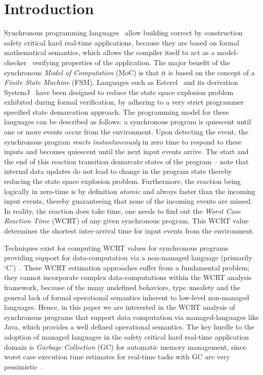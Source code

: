 \section{Introduction}
\label{sec:introduction}

Synchronous programming languages~\cite{berry92} allow building correct
by construction safety critical hard real-time applications, because
they are based on formal mathematical semantics, which allows the
compiler itself to act as a model-checker~\cite{jagadeesan1995safety}
verifying properties of the application. The major benefit of the
synchronous \textit{Model of Computation} (MoC) is that it is based on
the concept of a \textit{Finite State Machine} (FSM). Languages such as
Esterel~\cite{berry92} and its derivation SystemJ~\cite{amal10} have
been designed to reduce the state space explosion problem exhibited
during formal verification, by adhering to a very strict programmer
specified state demarcation approach. The programming model for these
languages can be described as follows: a synchronous program is
quiescent until one or more events occur from the environment. Upon
detecting the event, the synchronous program \textit{reacts}
\textit{instantaneously} in zero time to respond to these inputs and
becomes quiescent until the next input events arrive. The start and the
end of this reaction transition demarcate states of the program -- note
that internal data updates do not lead to change in the program state
thereby reducing the state space explosion problem. Furthermore, the
reaction being logically in zero-time is by definition \textit{atomic}
and always faster than the incoming input events, thereby guaranteeing
that none of the incoming events are missed. In reality, the reaction
does take time, one needs to find out the \textit{Worst Case Reaction
  Time} (WCRT) of any given synchronous program. This WCRT value
determines the shortest inter-arrival time for input events from the
environment.

Techniques exist for computing WCRT values for synchronous programs
providing support for data-computation via a non-managed language
(primarily `C')~\cite{boldt07,proop10}. These WCRT estimation approaches
suffer from a fundamental problem; they cannot incorporate complex
data-computations within the WCRT analysis framework, because of the
many undefined behaviors, type unsafety and the general lack of formal
operational semantics inherent to low-level non-managed
languages. Hence, in this paper we are interested in the WCRT analysis
of synchronous programs that support data computation via
managed-languages like Java, which provides a well defined operational
semantics. The key hurdle to the adoption of managed languages in the
safety critical hard real-time application domain is \textit{Garbage
  Collection} (GC) for automatic memory management, since worst case
execution time estimates for real-time tasks with GC are very
pessimistic~\cite{puffitsch2013design}.

